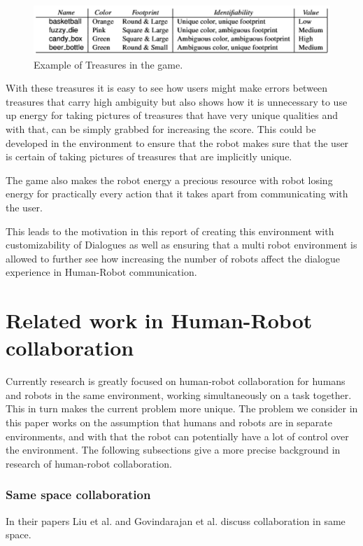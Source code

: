         \begin{figure}[!ht]
          
          \centering
            \includegraphics[width=1.02\textwidth]{figures/treasures.png}
            \caption{Example of Treasures in the game.}
        \end{figure}

      With these treasures it is easy to see how users might make errors between treasures that carry high ambiguity but also shows how it is unnecessary to use up energy for taking pictures of treasures that have very unique qualities and with that, can be simply grabbed for increasing the score. This could be developed in the environment to ensure that the robot makes sure that the user is certain of taking pictures of treasures that are implicitly unique.

      The game also makes the robot energy a precious resource with robot losing energy for practically every action that it takes apart from communicating with the user.

      This leads to the motivation in this report of creating this environment with customizability of Dialogues as well as ensuring that a multi robot environment is allowed to further see how increasing the number of robots affect the dialogue experience in Human-Robot communication.

    \section{Related work in Human-Robot collaboration}
      Currently research is greatly focused on human-robot collaboration for humans and robots in the same environment, working simultaneously on a task together. This in turn makes the current problem more unique. The problem we consider in this paper works on the assumption that humans and robots are in separate environments, and with that the robot can potentially have a lot of control over the environment. The following subsections give a more precise background in research of human-robot collaboration.

      \subsubsection{Same space collaboration}
        In their papers Liu et al.\cite{ChangLiu} and Govindarajan et al.\cite{Vijay} discuss collaboration in same space. 

